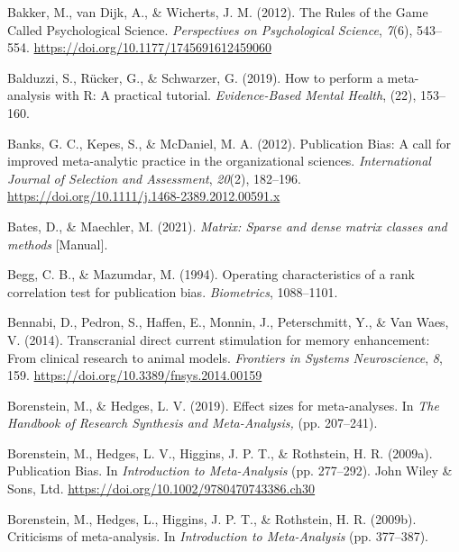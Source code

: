 \documentclass[
  man,floatsintext]{apa6}
\newlength{\cslhangindent}
\newlength{\cslentryspacingunit} %
\newenvironment{CSLReferences}[2] %
 {%
  \setlength{\parindent}{0pt}
  \ifodd #1
  \let\oldpar\par
  \def\par{\hangindent=\cslhangindent\oldpar}
  \fi
  \setlength{\parskip}{#2\cslentryspacingunit}
 }%
 {}
\begin{document}
\begin{CSLReferences}{1}{0}
\leavevmode{}%
Bakker, M., van Dijk, A., \& Wicherts, J. M. (2012). The {Rules} of the {Game Called Psychological Science}. \emph{Perspectives on Psychological Science}, \emph{7}(6), 543--554. \url{https://doi.org/10.1177/1745691612459060}

\leavevmode{}%
Balduzzi, S., Rücker, G., \& Schwarzer, G. (2019). How to perform a meta-analysis with {R}: A practical tutorial. \emph{Evidence-Based Mental Health}, (22), 153--160.

\leavevmode{}%
Banks, G. C., Kepes, S., \& McDaniel, M. A. (2012). Publication {Bias}: {A} call for improved meta-analytic practice in the organizational sciences. \emph{International Journal of Selection and Assessment}, \emph{20}(2), 182--196. \url{https://doi.org/10.1111/j.1468-2389.2012.00591.x}

\leavevmode{}%
Bates, D., \& Maechler, M. (2021). \emph{Matrix: {Sparse} and dense matrix classes and methods} {[}Manual{]}.

\leavevmode{}%
Begg, C. B., \& Mazumdar, M. (1994). Operating characteristics of a rank correlation test for publication bias. \emph{Biometrics}, 1088--1101.

\leavevmode{}%
Bennabi, D., Pedron, S., Haffen, E., Monnin, J., Peterschmitt, Y., \& Van Waes, V. (2014). Transcranial direct current stimulation for memory enhancement: From clinical research to animal models. \emph{Frontiers in Systems Neuroscience}, \emph{8}, 159. \url{https://doi.org/10.3389/fnsys.2014.00159}

\leavevmode{}%
Borenstein, M., \& Hedges, L. V. (2019). Effect sizes for meta-analyses. In \emph{The {Handbook} of {Research Synthesis} and {Meta-Analysis},} (pp. 207--241).

\leavevmode{}%
Borenstein, M., Hedges, L. V., Higgins, J. P. T., \& Rothstein, H. R. (2009a). Publication {Bias}. In \emph{Introduction to {Meta-Analysis}} (pp. 277--292). {John Wiley \& Sons, Ltd}. \url{https://doi.org/10.1002/9780470743386.ch30}

\leavevmode{}%
Borenstein, M., Hedges, L., Higgins, J. P. T., \& Rothstein, H. R. (2009b). Criticisms of meta-analysis. In \emph{Introduction to {Meta-Analysis}} (pp. 377--387).


\end{CSLReferences}
\end{document}
